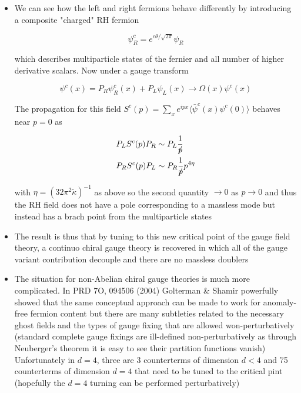 \begin{itemize}
  \item We can see how the left and right fermions behave differently by introducing a composite "charged" RH fermion

\begin{equation}
    \psi_{R}^{c}=e^{c \theta / \sqrt{2 \pi}} \psi_{R}
\end{equation}


which describes multiparticle states of the fernier and all number of higher derivative scalars. Now under a gauge transform

\begin{equation}
\psi^c(x)=P_{R} \psi_{R}^{c}(x)+P_{L} \psi_{L}(x) \rightarrow \Omega(x) \psi^{c}(x)
\end{equation}


The propagation for this field \(S^{c}(p)=\sum_{x} e^{i p x}\langle\bar{\psi}^c(x) \psi^c(0)\rangle\) behaves near \(p=0\) as

\begin{equation}
    \begin{aligned}
& P_{L} S^{c}(p) P_{R} \sim P_{L} \frac{1}{p\!\!\!/} \\
& P_{R} S^{c}(p) P_{L} \sim P_{R} \frac{1}{p\!\!\!/} p^{4 \eta}
\end{aligned}
\end{equation}


with \(\eta=\left(32 \pi^{2} \tilde{\kappa}\right)^{-1}\) as above so the second quantity \(\rightarrow 0\) as \(p \rightarrow 0\) and thus the RH field does not have a pole corresponding to a massless mode but instead has a brach point from the multiparticle states

  \item The result is thus that by tuning to this new critical point of the gauge field theory, a continuo chiral gauge theory is recovered in which all of the gauge variant contribution decouple and there are no massless doublers
  \item The situation for non-Abelian chiral gauge theories is much more complicated. In PRD 7O, 094506 (2004) Golterman \& Shamir powerfully showed that the same conceptual approach can be made to work for anomaly-free fermion content but there are many subtleties 
related to the necessary ghost fields and the types of gauge fixing that are allowed won-perturbatively (standard complete gauge fixings are ill-defined non-perturbatively as through Neuberger's theorem it is easy to see their partition functions vanish)\\
Unfortunately in $d=4$, three are 3 counterterms of dimension $d<4$ and 75 counterterms of dimension $d=4$ that need to be tuned to the critical pint (hopefully the $d=4$ turning can be performed perturbatively)
\end{itemize}

